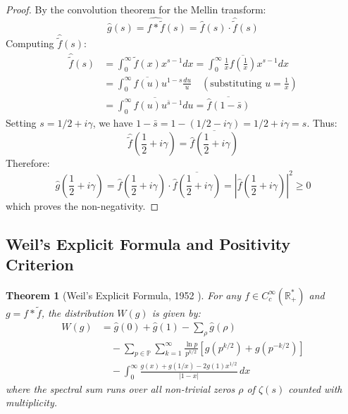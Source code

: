 \documentclass[11pt,a4paper]{article}
\newtheorem{theorem}{Theorem}[section]
\theoremstyle{definition}
\begin{document}
\begin{proof}
By the convolution theorem for the Mellin transform:
\begin{equation}
\hat{g}(s) = \widehat{f \ast \tilde{f}}(s) = \hat{f}(s) \cdot \widehat{\tilde{f}}(s)
\end{equation}
Computing $\widehat{\tilde{f}}(s)$:
\begin{align}
\widehat{\tilde{f}}(s) &= \int_0^\infty \tilde{f}(x) x^{s-1} dx = \int_0^\infty \frac{1}{x} \overline{f\left(\frac{1}{x}\right)} x^{s-1} dx \nonumber\\
&= \int_0^\infty \overline{f(u)} u^{1 - s} \frac{du}{u} \quad \left(\text{substituting } u = \frac{1}{x}\right) \nonumber\\
&= \overline{\int_0^\infty f(u) u^{\bar{s} - 1} du} = \overline{\hat{f}(1 - \bar{s})}
\end{align}
Setting $s = 1/2 + i\gamma$, we have $1 - \bar{s} = 1 - (1/2 - i\gamma) = 1/2 + i\gamma = s$. Thus:
\begin{equation}
\widehat{\tilde{f}}\left(\frac{1}{2} + i\gamma\right) = \overline{\hat{f}\left(\frac{1}{2} + i\gamma\right)}
\end{equation}
Therefore:
\begin{equation}
\hat{g}\left(\frac{1}{2} + i\gamma\right) = \hat{f}\left(\frac{1}{2} + i\gamma\right) \cdot \overline{\hat{f}\left(\frac{1}{2} + i\gamma\right)} = \left| \hat{f}\left(\frac{1}{2} + i\gamma\right) \right|^2 \ge 0
\end{equation}
which proves the non-negativity.
\end{proof}

\subsection{Weil's Explicit Formula and Positivity Criterion}
\begin{theorem}[Weil's Explicit Formula, 1952 \cite{weil1952}]\label{thm:weil_explicit_formula}
For any $f \in C_c^\infty(\mathbb{R}_+^*)$ and $g = f \ast \tilde{f}$, the distribution $W(g)$ is given by:
\begin{align}\label{eq:weil_full_distribution}
W(g) &= \hat{g}(0) + \hat{g}(1) - \sum_\rho \hat{g}(\rho) \nonumber\\
&\quad - \sum_{p \in \mathbb{P}} \sum_{k=1}^\infty \frac{\ln p}{p^{k/2}} \left[ g\left(p^{k/2}\right) + g\left(p^{-k/2}\right) \right] \nonumber\\
&\quad - \int_0^\infty \frac{g(x) + g(1/x) - 2g(1) x^{1/2}}{|1 - x|} \, dx
\end{align}
where the spectral sum runs over all non-trivial zeros $\rho$ of $\zeta(s)$ counted with multiplicity.
\end{theorem}
\end{document}
